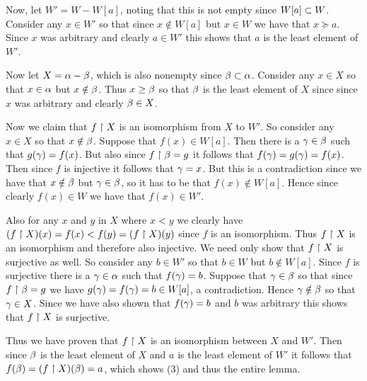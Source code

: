 \begin{questions}
{{      Now, let $W' = W - W[a]$, noting that this is not empty since $W[a] \subset W$.
      Consider any $x \in W'$ so that since $x \notin W[a]$ but $x \in W$ we have that $x \succeq a$.
      Since $x$ was arbitrary and clearly $a \in W'$ this shows that $a$ is the least element of $W'$.

      Now let $X = \alpha - \beta$, which is also nonempty since $\beta \subset \alpha$.
      Consider any $x \in X$ so that $x \in \alpha$ but $x \notin \beta$.
      Thus $x \geq \beta$ so that $\beta$ is the least element of $X$ since since $x$ was arbitrary and clearly $\beta \in X$.

      Now we claim that $f \restriction X$ is an isomorphism from $X$ to $W'$.
      So consider any $x \in X$ so that $x \notin \beta$.
      Suppose that $f(x) \in W[a]$.
      Then there is a $\gamma \in \beta$ such that $g(\gamma) = f(x)$.
      But also since $f \restriction \beta = g$ it follows that $f(\gamma) = g(\gamma) = f(x)$.
      Then since $f$ is injective it follows that $\gamma = x$.
      But this is a contradiction since we have that $x \notin \beta$ but $\gamma \in \beta$, so it has to be that $f(x) \notin W[a]$.
      Hence since clearly $f(x) \in W$ we have that $f(x) \in W'$.

      Also for any $x$ and $y$ in $X$ where $x < y$ we clearly have $(f \restriction X)(x) = f(x) < f(y) = (f \restriction X)(y)$ since $f$ is an isomorphism.
      Thus $f \restriction X$ is an isomorphism and therefore also injective.
      We need only show that $f \restriction X$ is surjective as well.
      So consider any $b \in W'$ so that $b \in W$ but $b \notin W[a]$.
      Since $f$ is surjective there is a $\gamma \in \alpha$ such that $f(\gamma) = b$.
      Suppose that $\gamma \in \beta$ so that since $f \restriction \beta = g$ we have $g(\gamma) = f(\gamma) = b \in W[a]$, a contradiction.
      Hence $\gamma \notin \beta$ so that $\gamma \in X$.
      Since we have also shown that $f(\gamma) = b$ and $b$ was arbitrary this shows that $f \restriction X$ is surjective.

      Thus we have proven that $f \restriction X$ is an isomorphism between $X$ and $W'$.
      Then since $\beta$ is the least element of $X$ and $a$ is the least element of $W'$ it follows that $f(\beta) = (f \restriction X)(\beta) = a$, which shows (3) and thus the entire lemma.
    }

    \mainthrm
    }
\end{questions}
